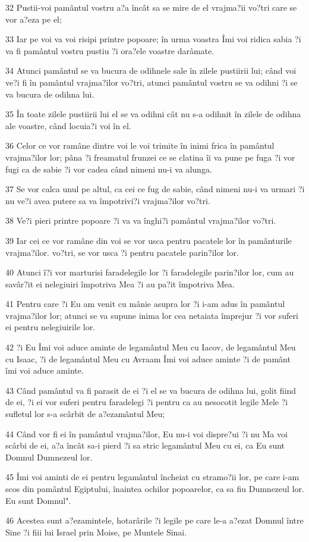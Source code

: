 \par 32 Pustii-voi pamântul vostru a?a încât sa se mire de el vrajma?ii vo?tri care se vor a?eza pe el;
\par 33 Iar pe voi va voi risipi printre popoare; în urma voastra Îmi voi ridica sabia ?i va fi pamântul vostru pustiu ?i ora?ele voastre darâmate.
\par 34 Atunci pamântul se va bucura de odihnele sale în zilele pustiirii lui; când voi ve?i fi în pamântul vrajma?ilor vo?tri, atunci pamântul vostru se va odihni ?i se va bucura de odihna lui.
\par 35 În toate zilele pustiirii lui el se va odihni cât nu s-a odihnit în zilele de odihna ale voastre, când locuia?i voi în el.
\par 36 Celor ce vor ramâne dintre voi le voi trimite în inimi frica în pamântul vrajma?ilor lor; pâna ?i freamatul frunzei ce se clatina îi va pune pe fuga ?i vor fugi ca de sabie ?i vor cadea când nimeni nu-i va alunga.
\par 37 Se vor calca unul pe altul, ca cei ce fug de sabie, când nimeni nu-i va urmari ?i nu ve?i avea putere sa va împotrivi?i vrajma?ilor vo?tri.
\par 38 Ve?i pieri printre popoare ?i va va înghi?i pamântul vrajma?ilor vo?tri.
\par 39 Iar cei ce vor ramâne din voi se vor usca pentru pacatele lor în pamânturile vrajma?ilor. vo?tri, se vor usca ?i pentru pacatele parin?ilor lor.
\par 40 Atunci î?i vor marturisi faradelegile lor ?i faradelegile parin?ilor lor, cum au savâr?it ei nelegiuiri împotriva Mea ?i au pa?it împotriva Mea.
\par 41 Pentru care ?i Eu am venit cu mânie asupra lor ?i i-am adus în pamântul vrajma?ilor lor; atunci se va supune inima lor cea netaiata împrejur ?i vor suferi ei pentru nelegiuirile lor.
\par 42 ?i Eu Îmi voi aduce aminte de legamântul Meu cu Iacov, de legamântul Meu cu Isaac, ?i de legamântul Meu cu Avraam Îmi voi aduce aminte ?i de pamânt îmi voi aduce aminte.
\par 43 Când pamântul va fi parasit de ei ?i el se va bucura de odihna lui, golit fiind de ei, ?i ei vor suferi pentru faradelegi ?i pentru ca au nesocotit legile Mele ?i sufletul lor s-a scârbit de a?ezamântul Meu;
\par 44 Când vor fi ei în pamântul vrajma?ilor, Eu nu-i voi dispre?ui ?i nu Ma voi scârbi de ei, a?a încât sa-i pierd ?i sa stric legamântul Meu cu ei, ca Eu sunt Domnul Dumnezeul lor.
\par 45 Îmi voi aminti de ei pentru legamântul încheiat cu stramo?ii lor, pe care i-am scos din pamântul Egiptului, înaintea ochilor popoarelor, ca sa fiu Dumnezeul lor. Eu sunt Domnul".
\par 46 Acestea sunt a?ezamintele, hotarârile ?i legile pe care le-a a?ezat Domnul între Sine ?i fiii lui Israel prin Moise, pe Muntele Sinai.

